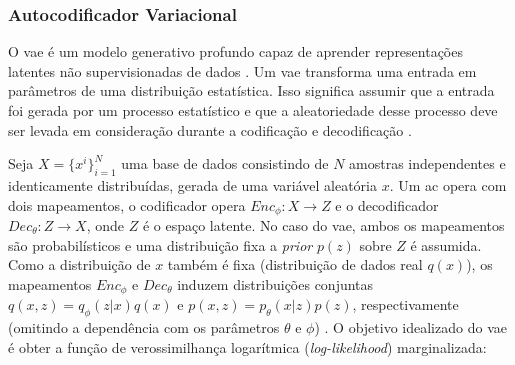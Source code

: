 





\subsubsection{Autocodificador Variacional}


O \gls{vae} \cite{kingma2013auto,rezende2014stochastic} é um modelo generativo profundo capaz de aprender representações latentes não supervisionadas de dados \cite{klys2018learning}.
Um \acrshort{vae} transforma uma entrada em parâmetros de uma distribuição estatística. Isso significa assumir que a entrada foi gerada por um processo estatístico e que a aleatoriedade desse processo deve ser levada em consideração durante a codificação e decodificação \cite{FrancoisDeepLearning}.

Seja $X = \{x^i\}_{i=1}^N$ uma base de dados consistindo de $N$ amostras independentes e identicamente distribuídas, gerada de uma variável aleatória $x$. Um \acrshort{ac} opera com dois mapeamentos, o codificador opera $Enc_{\phi}:X \rightarrow Z$ e o decodificador $Dec_{\theta}:Z \rightarrow X$, onde $Z$ é o espaço latente. No caso do \acrshort{vae}, ambos os mapeamentos são probabilísticos e uma distribuição fixa a \textit{prior} $p(z)$ sobre $Z$ é assumida. Como a distribuição de $x$ também é fixa (distribuição de dados real $q(x)$), os mapeamentos $Enc_{\phi}$ e  $Dec_{\theta}$ induzem distribuições conjuntas $q(x,z) = q_{\phi}(z|x)q(x)$ e $p(x,z) = p_{\theta}(x|z)p(z)$, respectivamente (omitindo a dependência com os parâmetros $\theta$ e $\phi$) \cite{rolinek2019variational}. O objetivo idealizado do \acrshort{vae} é obter a função de verossimilhança logarítmica (\textit{log-likelihood}) marginalizada:


